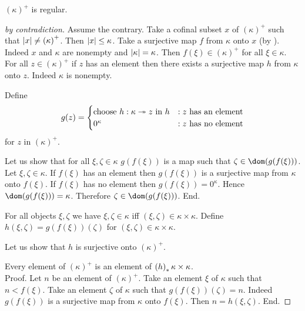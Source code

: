\documentclass{article}
\newcommand{\constzero}[1]{0^{#1}}
\newcommand{\cardsucc}[1]{\left(#1\right)^{+}}
\begin{document}
  \begin{forthel}
    \begin{theorem*}[Hausdorff]
      $\cardsucc{\kappa}$ is regular.
    \end{theorem*}
    \begin{proof}[by contradiction]
      Assume the contrary.
      Take a cofinal subset $x$ of $\cardsucc{\kappa}$ such that $\card{x} \neq \cardsucc{\kappa}$.
      Then $\left\vert x\right\vert \leq \kappa$.
      Take a surjective map $f$ from $\kappa$ onto $x$
      (by ).
      Indeed $x$ and $\kappa$ are nonempty and $\left\vert\kappa\right\vert = \kappa$.
      Then $f(\xi) \in \cardsucc{\kappa}$ for all $\xi \in \kappa$.
      For all $z \in \cardsucc{\kappa}$ if $z$ has an element then there exists a
      surjective map $h$ from $\kappa$ onto $z$.
      Indeed $\kappa$ is nonempty.

      Define \[ g(z) =
        \begin{cases}
          \text{choose $h : \kappa \onto z$ in $h$}
          & : \text{$z$ has an element}
          \\
          \text{$\constzero{\kappa}$}
          & : \text{$z$ has no element}
        \end{cases}
      \] for $z$ in $\cardsucc{\kappa}$.

      Let us show that for all $\xi, \zeta \in \kappa$ $g(f(\xi))$ is a map such
      that $\zeta \in \dom(g(f(\xi)))$.
        Let $\xi, \zeta \in \kappa$.
        If $f(\xi)$ has an element then $g(f(\xi))$ is a surjective map from
        $\kappa$ onto $f(\xi)$.
        If $f(\xi)$ has no element then $g(f(\xi)) = \constzero{\kappa}$.
        Hence $\dom(g(f(\xi))) = \kappa$.
        Therefore $\zeta \in \dom(g(f(\xi)))$.
      End.

      For all objects $\xi, \zeta$ we have $\xi, \zeta \in \kappa$ iff
      $(\xi, \zeta) \in \kappa \times \kappa$.
      Define $h(\xi,\zeta) = g(f(\xi))(\zeta)$ for $(\xi,\zeta) \in \kappa
      \times \kappa$.

      Let us show that $h$ is surjective onto $\cardsucc{\kappa}$.

        Every element of $\cardsucc{\kappa}$ is an element of $\left(h\right)_{*}{\kappa \times \kappa}$. \\
        Proof.
          Let $n$ be an element of $\cardsucc{\kappa}$.
          Take an element $\xi$ of $\kappa$ such that $n \less f(\xi)$.
          Take an element $\zeta$ of $\kappa$ such that $g(f(\xi))(\zeta) = n$.
          Indeed $g(f(\xi))$ is a surjective map from $\kappa$ onto $f(\xi)$.
          Then $n = h(\xi,\zeta)$.
        End.


\end{proof}
\end{forthel}
\end{document}

